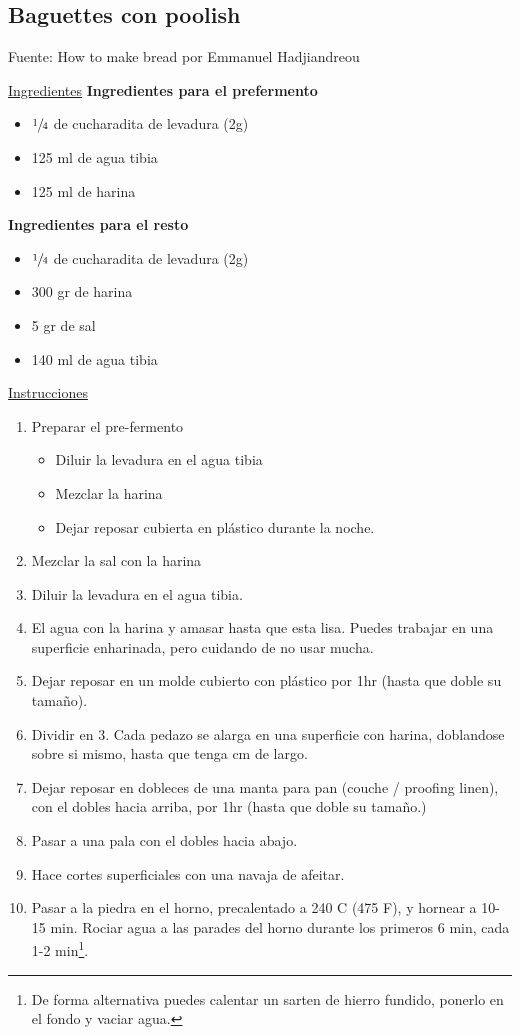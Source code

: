 \subsection{Baguettes con poolish}

Fuente: How to make bread por Emmanuel Hadjiandreou

\underline{Ingredientes}
\textbf{Ingredientes para el prefermento}
\begin{itemize}
\item $\sfrac{1}{4}$ de cucharadita de levadura (2g)
\item 125 ml de agua tibia
\item 125 ml de harina
\end{itemize}

\textbf{Ingredientes para el resto}
\begin{itemize}
\item $\sfrac{1}{4}$ de cucharadita de levadura (2g)
\item 300 gr de harina
\item 5 gr de sal
\item 140 ml de agua tibia
\end{itemize}

\underline{Instrucciones}
\begin{enumerate}
\item Preparar el pre-fermento
\begin{itemize}
\item Diluir la levadura en el agua tibia
\item Mezclar la harina
\item Dejar reposar cubierta en plástico durante la noche.
\end{itemize} 
\item Mezclar la sal con la harina
\item Diluir la levadura en el agua tibia.
\item El agua con la harina y amasar hasta que esta lisa. Puedes trabajar en una superficie enharinada, pero cuidando de no usar mucha.
\item Dejar reposar en un molde cubierto con plástico por \Sim 1hr (hasta que doble su tamaño).
\item Dividir en 3. Cada pedazo se alarga en una superficie con harina, doblandose sobre si mismo, hasta que tenga  cm de largo.
\item Dejar reposar en dobleces de una manta para pan (couche / proofing linen), con el dobles hacia arriba, por \Sim 1hr (hasta que doble su tamaño.)
\item Pasar a una pala con el dobles hacia abajo.
\item Hace cortes superficiales con una navaja de afeitar.
\item Pasar a la piedra en el horno, precalentado a 240 C (475 F), y hornear a 10-15 min. Rociar agua a las parades del horno durante los primeros 6 min, cada 1-2 min\footnote{De forma alternativa puedes calentar un sarten de hierro fundido, ponerlo en el fondo y vaciar agua.}.
\end{enumerate}
